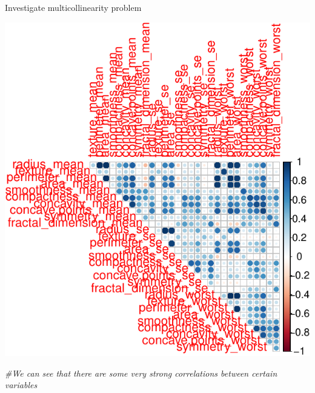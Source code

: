 \documentclass[]{article}
\newenvironment{Shaded}{\begin{snugshade}}{\end{snugshade}}
\newcommand{\KeywordTok}[1]{\textcolor[rgb]{0.13,0.29,0.53}{\textbf{#1}}}
\newcommand{\DataTypeTok}[1]{\textcolor[rgb]{0.13,0.29,0.53}{#1}}
\newcommand{\StringTok}[1]{\textcolor[rgb]{0.31,0.60,0.02}{#1}}
\newcommand{\CommentTok}[1]{\textcolor[rgb]{0.56,0.35,0.01}{\textit{#1}}}
\newcommand{\OtherTok}[1]{\textcolor[rgb]{0.56,0.35,0.01}{#1}}
\newcommand{\OperatorTok}[1]{\textcolor[rgb]{0.81,0.36,0.00}{\textbf{#1}}}
\newcommand{\NormalTok}[1]{#1}
\begin{document}
Investigate multicollinearity problem

\begin{Shaded}
\end{Shaded}

\includegraphics{Logistic-LASSO_files/figure-latex/unnamed-chunk-3-1.pdf}

\begin{Shaded}
\begin{Highlighting}[]
\CommentTok{#We can see that there are some very strong correlations between certain variables}
\end{Highlighting}
\end{Shaded}
\end{document}
